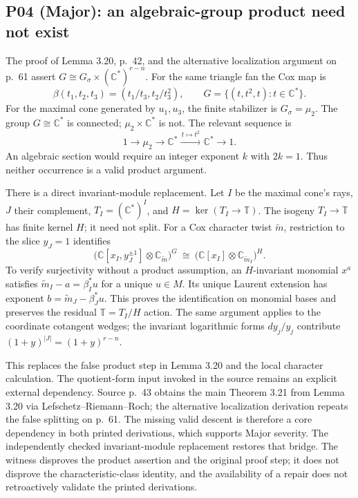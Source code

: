 \documentclass[10pt]{article}
\begin{document}
\subsection*{P04 (Major): an algebraic-group product need not exist}
The proof of Lemma 3.20, p. 42, and the alternative localization argument on p. 61 assert \(G\cong G_\sigma\times(\mathbb C^*)^{r-n}\). For the same triangle fan the Cox map is \[\beta(t_1,t_2,t_3)=(t_1/t_3,t_2/t_3^2),\qquad
 G=\{(t,t^2,t):t\in\mathbb C^*\}.\] For the maximal cone generated by \(u_1,u_3\), the finite stabilizer is \(G_\sigma=\mu_2\). The group \(G\cong\mathbb C^*\) is connected; \(\mu_2\times\mathbb C^*\) is not. The relevant sequence is \[1\longrightarrow\mu_2\longrightarrow\mathbb C^*
 \xrightarrow{\,t\mapsto t^2\,}\mathbb C^*
 \longrightarrow1.\] An algebraic section would require an integer exponent \(k\) with \(2k=1\). Thus neither occurrence is a valid product argument.\par
There is a direct invariant-module replacement. Let \(I\) be the maximal cone’s rays, \(J\) their complement, \(T_I=(\mathbb C^*)^I\), and \(H=\ker(T_I\to\mathbb T)\). The isogeny \(T_I\to\mathbb T\) has finite kernel \(H\); it need not split. For a Cox character twist \(\widetilde m\), restriction to the slice \(y_J=1\) identifies \[\bigl(\mathbb C[x_I,y_J^{\pm1}]\otimes\mathbb C_{\widetilde m}\bigr)^G
 \ \cong\
 \bigl(\mathbb C[x_I]\otimes\mathbb C_{\widetilde m_I}\bigr)^H.\] To verify surjectivity without a product assumption, an \(H\)-invariant monomial \(x^a\) satisfies \(\widetilde m_I-a=\beta_I^*u\) for a unique \(u\in M\). Its unique Laurent extension has exponent \(b=\widetilde m_J-\beta_J^*u\). This proves the identification on monomial bases and preserves the residual \(\mathbb T=T_I/H\) action. The same argument applies to the coordinate cotangent wedges; the invariant logarithmic forms \(dy_j/y_j\) contribute \((1+y)^{|J|}=(1+y)^{r-n}\).\par
This replaces the false product step in Lemma 3.20 and the local character calculation. The quotient-form input invoked in the source remains an explicit external dependency. Source p. 43 obtains the main Theorem 3.21 from Lemma 3.20 via Lefschetz–Riemann–Roch; the alternative localization derivation repeats the false splitting on p. 61. The missing valid descent is therefore a core dependency in both printed derivations, which supports Major severity. The independently checked invariant-module replacement restores that bridge. The witness disproves the product assertion and the original proof step; it does not disprove the characteristic-class identity, and the availability of a repair does not retroactively validate the printed derivations.\par
\end{document}
